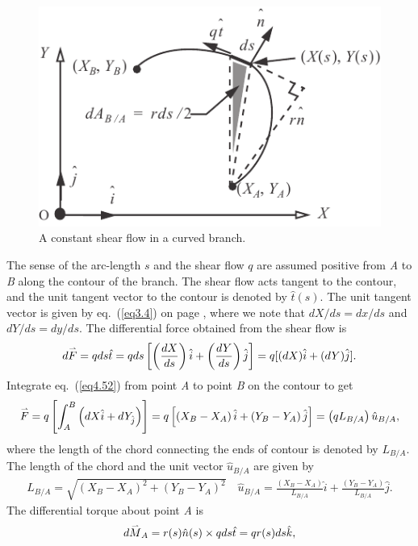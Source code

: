 \documentclass{AeroStructure-ERJohnson}
\def\harp#1{\smash{\mathord{\buildrel{\lower3pt\hbox{$\scriptscriptstyle\rightharpoonup$}}\over{#1}}}}
\begin{document}
\begin{figure}
\vspace{-30pt}
\includegraphics{Figure_4-30.pdf}
\caption{A constant shear flow in a curved
branch.\label{fig4.30}}
\end{figure}


The sense of the arc-length $s$ and the shear flow $q$ are assumed positive from \textit{A} to \textit{B} along the contour of the branch. The shear flow acts tangent to the contour, and the unit tangent vector to the contour is denoted by $\hat{t}(s)$. The unit tangent vector is given by eq.~(\ref{eq3.4}) on page \pageref{eq3.4}, where we note that $d X/d s=d x/d s$ and $d Y/d s=d y/d s$. The differential force obtained from the shear flow is
\begin{align}\label{eq4.52}
d \harp{F}=q d s \hat{t}=q d s\left[\left(\frac{d X}{d s}\right) \hat{i}+\left(\frac{d Y}{d s}\right) \hat{j}\right]=q[(d X) \hat{i}+(d Y) \hat{j}].
\end{align}
Integrate eq.~(\ref{eq4.52}) from point \textit{A} to point \textit{B} on the contour to get
\begin{align}\label{eq4.53}
\harp{F}=q\left[\int_{A}^{B}\left(d X \hat{i}+d Y_{\hat{j}}\right)\right]=q\left[\left(X_{B}-X_{A}\right) \hat{i}+\left(Y_{B}-Y_{A}\right) \hat{j}\right]=\left(q L_{B/A}\right) \hat{u}_{B/A},
\end{align}
where the length of the chord connecting the ends of contour is denoted by $L_{B/A}$. The length of the chord and the unit vector $\hat{u}_{B/A}$ are given by
\begin{align}\label{eq4.54}
L_{B/A}=\sqrt{\left(X_{B}-X_{A}\right)^{2}+\left(Y_{B}-Y_{A}\right)^{2}} \quad \hat{u}_{B/ A}=\frac{\left(X_{B}-X_{A}\right)}{L_{B/A}} \hat{i}+\frac{\left(Y_{B}-Y_{A}\right)}{L_{B/A}} \hat{j}.
\end{align}
The differential torque about point \textit{A} is
\begin{align}\label{eq4.55}
d \harp{M}_{A}=r(s) \hat{n}(s) \times q d s \hat{t}=q r(s) d s \hat{k},
\end{align}
\vspace*{5pt}
\clearpage
\end{document}
